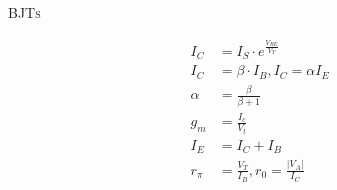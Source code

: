 \documentclass[10pt,letterpaper,english]{article}
\begin{document}
\textsc{BJTs}\\
\begin{multicols}{2}
\begin{align*}
I_C&=I_S\cdot e^{\frac{V_{BE}}{V_T}}\nonumber\\
I_C&=\beta \cdot I_B, I_C = \alpha I_E\nonumber\\
\alpha&=\frac{\beta}{\beta + 1}\nonumber\\
g_m& = \frac{I_c}{V_t}\nonumber\\
I_E&= I_C + I_B\nonumber\\
r_\pi&= \frac{V_T}{I_B}, r_0 = \frac{|V_A|}{I_C}\nonumber\\
\end{align*}
\end{multicols}
\end{document}
